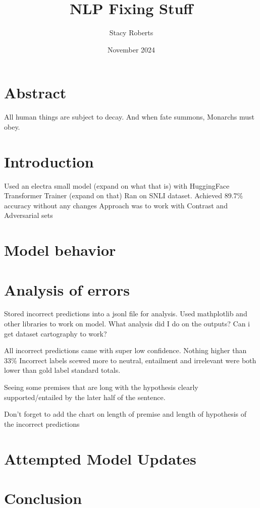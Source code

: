 \documentclass{article}
\title{NLP Fixing Stuff}
\author{Stacy Roberts}
\date{November 2024}
\begin{document}
\maketitle

\begin{multicols*}{2}

\section*{Abstract}
All human things are subject to decay. And when fate summons, Monarchs must obey.

\section*{Introduction}

Used an electra small model (expand on what that is) with HuggingFace Transformer Trainer (expand on that)
Ran on SNLI dataset. Achieved 89.7\% accuracy without any changes
Approach was to work with Contrast and Adversarial sets

\section*{Model behavior}

\section*{Analysis of errors}

Stored incorrect predictions into a jsonl file for analysis. Used mathplotlib and other libraries to work on model.
What analysis did I do on the outputs? Can i get dataset cartography to work?

All incorrect predictions came with super low confidence. Nothing higher than 33\%
Incorrect labels scewed more to neutral, entailment and irrelevant were both lower than gold label standard totals.

Seeing some premises that are long with the hypothesis clearly supported/entailed by the later half of the sentence. 

Don't forget to add the chart on length of premise and length of hypothesis of the incorrect predictions
\section*{Attempted Model Updates}

\section*{Conclusion}



\end{multicols*}
\end{document}
